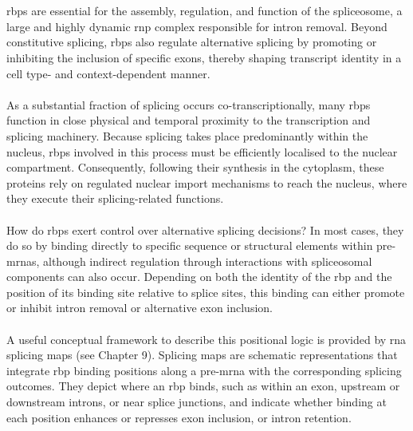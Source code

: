 \\
\\
\glspl{rbp} are essential for the assembly, regulation, and function of the spliceosome, a large and highly dynamic \gls{rnp} complex responsible for intron removal\cite{marasco_physiology_2023}. Beyond constitutive splicing, \glspl{rbp} also regulate alternative splicing by promoting or inhibiting the inclusion of specific exons, thereby shaping transcript identity in a cell type- and context-dependent manner\cite{van_nostrand_large-scale_2020, marasco_physiology_2023, tapial_atlas_2017}. 
\\
\\
As a substantial fraction of splicing occurs co-transcriptionally\cite{van_nostrand_large-scale_2020, marasco_physiology_2023}, many \glspl{rbp} function in close physical and temporal proximity to the transcription and splicing machinery\cite{van_nostrand_large-scale_2020, marasco_physiology_2023}. Because splicing takes place predominantly within the nucleus, \glspl{rbp} involved in this process must be efficiently localised to the nuclear compartment\cite{van_nostrand_large-scale_2020, marasco_physiology_2023}. Consequently, following their synthesis in the cytoplasm, these proteins rely on regulated nuclear import mechanisms to reach the nucleus\cite{guo_nuclear-import_2018}, where they execute their splicing-related functions.
\\
\\
How do \glspl{rbp} exert control over alternative splicing decisions? In most cases, they do so by binding directly to specific sequence or structural elements within pre-\glspl{mrna}, although indirect regulation through interactions with spliceosomal components can also occur\cite{van_nostrand_large-scale_2020}. Depending on both the identity of the \gls{rbp} and the position of its binding site relative to splice sites, this binding can either promote or inhibit intron removal or alternative exon inclusion\cite{van_nostrand_large-scale_2020, tapial_atlas_2017}.
\\
\\
A useful conceptual framework to describe this positional logic is provided by \gls{rna} splicing maps (see Chapter 9). Splicing maps are schematic representations that integrate \gls{rbp} binding positions along a pre-\gls{mrna} with the corresponding splicing outcomes\cite{van_nostrand_large-scale_2020}. They depict where an \gls{rbp} binds, such as within an exon, upstream or downstream introns, or near splice junctions, and indicate whether binding at each position enhances or represses exon inclusion, or intron retention\cite{van_nostrand_large-scale_2020}. 
